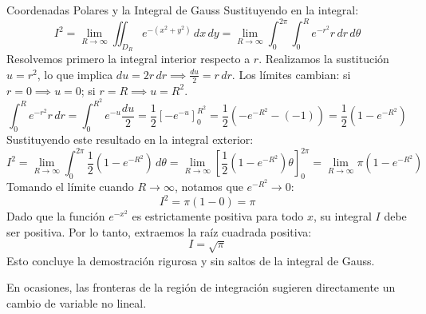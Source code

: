 \documentclass[11pt,a4paper]{article}
\begin{document}
\begin{ejerciciobox}{Coordenadas Polares y la Integral de Gauss}
Sustituyendo en la integral:
\begin{equation*}
I^2 = \lim_{R \to \infty} \iint_{D_R} e^{-(x^2+y^2)} \, dx \, dy = \lim_{R \to \infty} \int_{0}^{2\pi} \int_{0}^{R} e^{-r^2} r \, dr \, d\theta
\end{equation*}
Resolvemos primero la integral interior respecto a $r$. Realizamos la sustitución $u = r^2$, lo que implica $du = 2r \, dr \implies \frac{du}{2} = r \, dr$. Los límites cambian: si $r=0 \implies u=0$; si $r=R \implies u=R^2$.
\begin{equation*}
\int_{0}^{R} e^{-r^2} r \, dr = \int_{0}^{R^2} e^{-u} \frac{du}{2} = \frac{1}{2} \left[ -e^{-u} \right]_{0}^{R^2} = \frac{1}{2} ( -e^{-R^2} - (-1) ) = \frac{1}{2} (1 - e^{-R^2})
\end{equation*}
Sustituyendo este resultado en la integral exterior:
\begin{equation*}
I^2 = \lim_{R \to \infty} \int_{0}^{2\pi} \frac{1}{2} (1 - e^{-R^2}) \, d\theta = \lim_{R \to \infty} \left[ \frac{1}{2} (1 - e^{-R^2}) \theta \right]_{0}^{2\pi} = \lim_{R \to \infty} \pi (1 - e^{-R^2})
\end{equation*}
Tomando el límite cuando $R \to \infty$, notamos que $e^{-R^2} \to 0$:
\begin{equation*}
I^2 = \pi(1 - 0) = \pi
\end{equation*}
Dado que la función $e^{-x^2}$ es estrictamente positiva para todo $x$, su integral $I$ debe ser positiva. Por lo tanto, extraemos la raíz cuadrada positiva:
\begin{equation*}
I = \sqrt{\pi}
\end{equation*}
Esto concluye la demostración rigurosa y sin saltos de la integral de Gauss.
\end{ejerciciobox}

En ocasiones, las fronteras de la región de integración sugieren directamente un cambio de variable no lineal.
\end{document}
